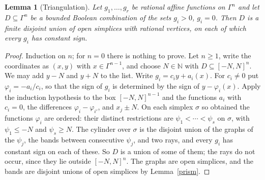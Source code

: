 \documentclass[12pt]{amsart}
\newtheorem{lem}{Lemma}
\theoremstyle{remark}
\newcommand{\N}{\mathbb N}
\begin{document}
\begin{lem}[Triangulation]\label{tri}
Let $g_1, \ldots, g_r$ be rational affine functions on $\Gamma^n$ and let $D \subseteq \Gamma^n$ be a bounded Boolean combination of the sets $g_i > 0$, $g_i = 0$. Then $D$ is a finite disjoint union of open simplices with rational vertices, on each of which every $g_i$ has constant sign.
\end{lem}
\begin{proof}
Induction on $n$; for $n = 0$ there is nothing to prove. Let $n \geq 1$, write the coordinates as $(x, y)$ with $x \in \Gamma^{n-1}$, and choose $N \in \N$ with $D \subseteq [-N, N]^n$. We may add $y - N$ and $y + N$ to the list. Write $g_i = c_i y + a_i(x)$. For $c_i \neq 0$ put $\varphi_i = - a_i / c_i$, so that the sign of $g_i$ is determined by the sign of $y - \varphi_i(x)$. Apply the induction hypothesis to the box $[-N, N]^{n-1}$ and the functions $a_i$ with $c_i = 0$, the differences $\varphi_i - \varphi_{i'}$, and $x_j \pm N$. On each simplex $\sigma$ so obtained the functions $\varphi_i$ are ordered: their distinct restrictions are $\psi_1 < \cdots < \psi_s$ on $\sigma$, with $\psi_1 \leq -N$ and $\psi_s \geq N$. The cylinder over $\sigma$ is the disjoint union of the graphs of the $\psi_j$, the bands between consecutive $\psi_j$, and two rays, and every $g_i$ has constant sign on each of these. So $D$ is a union of some of them; the rays do not occur, since they lie outside $[-N, N]^n$. The graphs are open simplices, and the bands are disjoint unions of open simplices by Lemma~\ref{prism}.
\end{proof}
\end{document}
